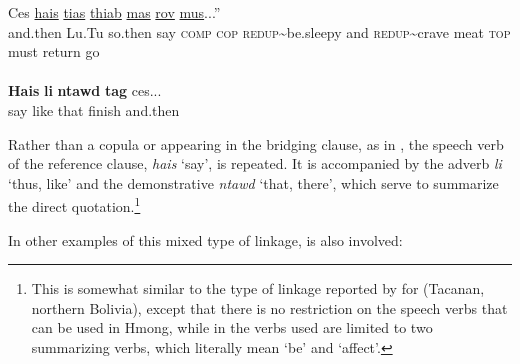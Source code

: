 \documentclass[output=paper]{LSP/langsci}
\begin{document}
\begin{exe}
\ex \label{Jaex:13ab}
\begin{xlist}
\ex \label{Jaex:13a}
\gll Ces \underline{} \underline{} \underline{hais} \underline{tias} \underline{}     \underline{} \underline{thiab} \underline{} \underline{} \underline{mas} \underline{} \underline{rov} \underline{mus}...'' \\
 and.then Lu.Tu so.then say \textsc{comp} \textsc{cop} \textsc{redup}{\textasciitilde}be.sleepy and \textsc{redup}{\textasciitilde}crave  meat \textsc{top} must return go\\
\glt {}\\
\ex \label{Jaex:13b}
\gll \textbf{Hais} \textbf{li}  \textbf{ntawd} \textbf{tag} ces...\\     	      
     say like that  finish  and.then\\
\glt {} \citep[][8]{johnson92}
\end{xlist}
\end{exe}


\noindent
Rather than a copula or  appearing in the bridging clause, as in , the speech verb of the reference clause, \textit{hais} `say', is repeated. It is accompanied by the  adverb \textit{li} `thus, like' and the demonstrative \textit{ntawd} `that, there', which serve to summarize the direct quotation.\footnote{ This is somewhat similar to the type of linkage reported by \citet[][128--129]{Guillaume2011} for  (Tacanan, northern Bolivia), except that there is no restriction on the speech verbs that can be used in Hmong, while in  the verbs used are limited to two summarizing verbs, which literally mean `be' and `affect'.} 

In other examples of this mixed type of linkage,  is also involved:
\end{document}
